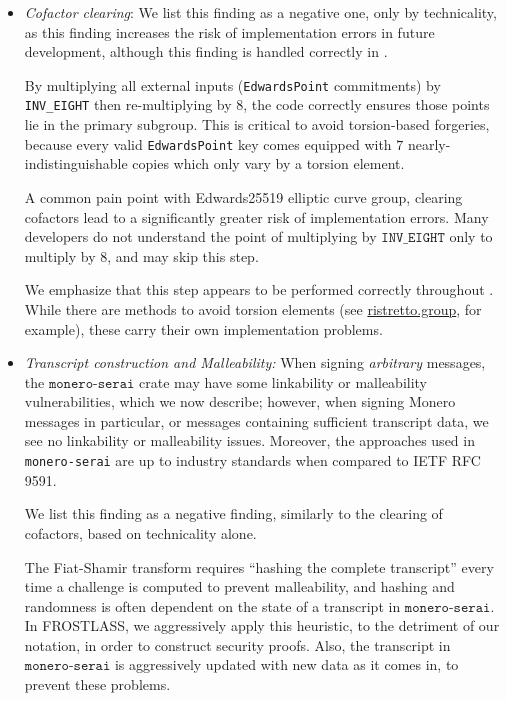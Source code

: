 \documentclass[12pt,a4paper]{article}
\begin{document}
\begin{itemize}
\item \emph{Cofactor clearing}: We list this finding as a negative one, only by technicality, as this finding increases the risk of implementation errors in future development, although this finding is handled correctly in \cite{SeraiRepo}.

By multiplying all external inputs (\texttt{EdwardsPoint} commitments) by \texttt{INV\_EIGHT} then re-multiplying by $8$, the code correctly ensures those points lie in the primary subgroup.  This is critical to avoid torsion-based forgeries, because every valid \texttt{EdwardsPoint} key comes equipped with $7$ nearly-indistinguishable copies which only vary by a torsion element.

A common pain point with Edwards25519 elliptic curve group, clearing cofactors lead to a significantly greater risk of implementation errors. Many developers do not understand the point of multiplying by $\texttt{INV\_EIGHT}$ only to multiply by $8$, and may skip this step.

    We emphasize that this step appears to be performed correctly throughout \cite{SeraiRepo}. While there are methods to avoid torsion elements (see \url{ristretto.group}, for example), these carry their own implementation problems.

    \item \textit{Transcript construction and Malleability:}  When signing \textit{arbitrary} messages, the $\texttt{monero-serai}$ crate may have some linkability or malleability vulnerabilities, which we now describe; however, when signing Monero messages in particular, or messages containing sufficient transcript data, we see no linkability or malleability issues.   Moreover, the approaches used in \texttt{monero-serai} are up to industry standards when compared to IETF RFC 9591.

    We list this finding as a negative finding, similarly to the clearing of cofactors, based on technicality alone.

    The Fiat-Shamir transform requires ``hashing the complete transcript'' every time a challenge is computed to prevent malleability, and hashing and randomness is often dependent on the state of a transcript in $\texttt{monero-serai}$.   In FROSTLASS, we aggressively apply this heuristic, to the detriment of our notation, in order to construct security proofs. Also, the transcript in $\texttt{monero-serai}$ is aggressively updated with new data as it comes in, to prevent these problems.


\end{itemize}
\end{document}
